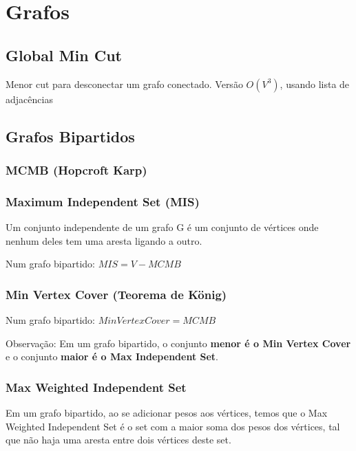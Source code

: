 \section{Grafos}

\subsection{Global Min Cut}
Menor cut para desconectar um grafo conectado. Vers\~{a}o $O(V^3)$, usando lista de adjac\^{e}ncias
\divisor

\subsection{Grafos Bipartidos}

\subsubsection{MCMB (Hopcroft Karp)}
\divisor

\subsubsection{Maximum Independent Set (MIS)}
Um conjunto independente de um grafo G é um conjunto de vértices onde nenhum deles tem uma aresta ligando a outro.

Num grafo bipartido: $MIS = V - MCMB$
\divisor

\subsubsection{Min Vertex Cover (Teorema de König)}
Num grafo bipartido: $Min Vertex Cover = MCMB$

Observação: Em um grafo bipartido, o conjunto \textbf{menor é o Min Vertex Cover} e o conjunto \textbf{maior é o Max Independent Set}.
\divisor

\subsubsection{Max Weighted Independent Set}
Em um grafo bipartido, ao se adicionar pesos aos v\'{e}rtices, temos que o Max Weighted Independent Set \'{e} o set com a maior soma dos pesos dos v\'{e}rtices, tal que n\~{a}o haja uma aresta entre dois v\'{e}rtices deste set.

